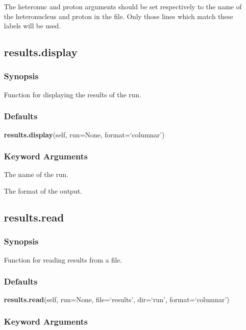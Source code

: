 The heteronuc and proton arguments should be set respectively to the name of the
heteronucleus and proton in the file.  Only those lines which match these labels will be
used.


\newpage

\subsection{results.display}


\subsubsection{Synopsis}

Function for displaying the results of the run.

\subsubsection{Defaults}

\textsf{\textbf{results.display}(self, run=None, format=`columnar')}


\subsubsection{Keyword Arguments}


  The name of the run.

  The format of the output.


\newpage

\subsection{results.read}


\subsubsection{Synopsis}

Function for reading results from a file.

\subsubsection{Defaults}

\textsf{\textbf{results.read}(self, run=None, file=`results', dir=`run', format=`columnar')}


\subsubsection{Keyword Arguments}


